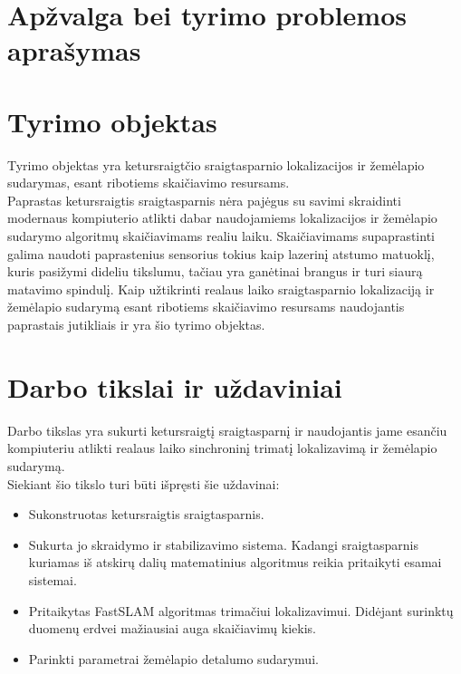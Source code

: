 \documentclass[12pt, a4paper, lithuanian]{article}
\begin{document}
\begin{onehalfspacing}

\section*{Ap\v{z}valga bei tyrimo problemos apra\v{s}ymas}

\section{Tyrimo objektas}

Tyrimo objektas yra ketursraigt\v{c}io sraigtasparnio lokalizacijos ir \v{z}em\.elapio sudarymas, esant ribotiems skai\v{c}iavimo resursams.
\\
\indent Paprastas ketursraigtis sraigtasparnis n\.era paj\.egus su savimi skraidinti modernaus kompiuterio atlikti dabar naudojamiems lokalizacijos ir \v{z}em\.elapio sudarymo algoritm\k{u} skai\v{c}iavimams realiu laiku. Skai\v{c}iavimams supaprastinti galima naudoti paprastenius sensorius tokius kaip lazerin\k{i} atstumo matuokl\k{i}, kuris pasi\v{z}ymi dideliu tikslumu, ta\v{c}iau yra gan\.{e}tinai brangus ir turi siaur\k{a} matavimo spindul\k{i}. Kaip u\v{z}tikrinti  realaus laiko sraigtasparnio lokalizacij\k{a} ir \v{z}em\.elapio sudarym\k{a} esant ribotiems skai\v{c}iavimo resursams naudojantis paprastais jutikliais ir yra \v{s}io tyrimo objektas. 

\section{Darbo tikslai ir u\v{z}daviniai}
Darbo tikslas yra sukurti ketursraigt\k{i} sraigtasparn\k{i} ir naudojantis jame esan\v{c}iu kompiuteriu atlikti realaus laiko sinchronin\k{i} trimat\k{i} lokalizavim\k{a} ir \v{z}em\.elapio sudarym\k{a}. 
\\
\indent Siekiant \v{s}io tikslo turi b\=uti i\v{s}pr\k{e}sti \v{s}ie u\v{z}davinai:
\begin{itemize}
\item Sukonstruotas ketursraigtis sraigtasparnis.  
\item Sukurta jo skraidymo ir stabilizavimo sistema. Kadangi sraigtasparnis kuriamas i\v{s} atskir\k{u} dali\k{u} matematinius algoritmus reikia pritaikyti esamai sistemai.
\item Pritaikytas FastSLAM algoritmas trima\v{c}iui lokalizavimui\cite{Zikos2011}. Did\.ejant surinkt\k{u} duomen\k{u} erdvei ma\v{z}iausiai auga skai\v{c}iavim\k{u} kiekis.
\item Parinkti parametrai \v{z}em\.elapio detalumo sudarymui.
\end{itemize}
     

\end{onehalfspacing}
\end{document}
